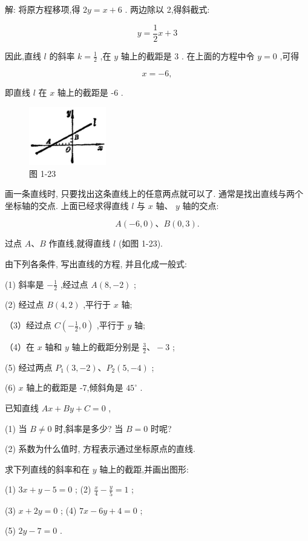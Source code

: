 \documentclass[lang=cn,newtx,10pt,scheme=chinese]{elegantbook}
\begin{document}
解: 将原方程移项,得 \({2y} = x + 6\) . 两边除以 2,得斜截式:

\[
  y = \frac{1}{2}x + 3
\]

因此,直线 \(l\) 的斜率 \(k = \frac{1}{2}\) ,在 \(y\) 轴上的截距是 3 . 在上面的方程中令 \(y = 0\) ,可得

\[
  x = - 6,
\]

即直线 \(l\) 在 \(x\) 轴上的截距是 -6 .

\begin{figure}[h]
  \centering
  \includegraphics[max width=0.3\textwidth]{images/01912cc2-ffb6-728e-9ae7-b113ff05c64b_30_525610.jpg}
  \caption{图 1-23}
\end{figure}



画一条直线时, 只要找出这条直线上的任意两点就可以了. 通常是找出直线与两个坐标轴的交点. 上面已经求得直线 \(l\) 与 \(x\) 轴、 \(y\) 轴的交点:

\[
  A\left( {-6,0}\right) \text{、}B\left( {0,3}\right) \text{.}
\]

过点 \(A\text{、}B\) 作直线,就得直线 \(l\) (如图 1-23).

\begin{problemset}[练习]

\item 由下列各条件, 写出直线的方程, 并且化成一般式:

(1) 斜率是 \(- \frac{1}{2}\) ,经过点 \(A\left( {8, - 2}\right)\) ;

(2) 经过点 \(B\left( {4,2}\right)\) ,平行于 \(x\) 轴;

（3）经过点 \(C\left( {-\frac{1}{2},0}\right)\) ,平行于 \(y\) 轴;

（4）在 \(x\) 轴和 \(y\) 轴上的截距分别是 \(\frac{3}{2}\text{、} - 3\) ;

(5) 经过两点 \({P}_{1}\left( {3, - 2}\right) \text{、}{P}_{2}\left( {5, - 4}\right)\) ;

(6) \(x\) 轴上的截距是 -7,倾斜角是 \({45}^{ \circ }\) .

\item 已知直线 \({Ax} + {By} + C = 0\) ,

(1) 当 \(B \neq 0\) 时,斜率是多少? 当 \(B = 0\) 时呢?

(2) 系数为什么值时, 方程表示通过坐标原点的直线.

\item 求下列直线的斜率和在 \(y\) 轴上的截距,并画出图形:

(1) \({3x} + y - 5 = 0\) ; (2) \(\frac{x}{4} - \frac{y}{5} = 1\) ;

(3) \(x + {2y} = 0\) ; (4) \({7x} - {6y} + 4 = 0\) ;

(5) \({2y} - 7 = 0\) .

\end{problemset}
\end{document}

